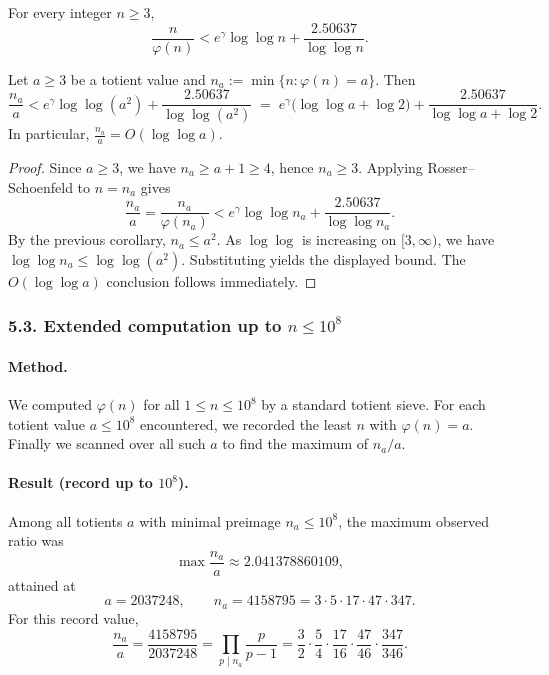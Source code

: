\begin{theorem}
For every integer $n\ge 3$,
\[
\frac{n}{\varphi(n)}<e^{\gamma}\log\log n+\frac{2.50637}{\log\log n}.
\]
\end{theorem}

\begin{theorem}
Let $a\ge 3$ be a totient value and $n_a:=\min\{n:\varphi(n)=a\}$.
Then
\[
\frac{n_a}{a}<e^{\gamma}\log\log(a^2)+\frac{2.50637}{\log\log(a^2)}
\;=\;
 e^{\gamma}\bigl(\log\log a+\log 2\bigr)+\frac{2.50637}{\log\log a+\log 2}.
\]
In particular, $\frac{n_a}{a}=O(\log\log a)$.
\end{theorem}

\begin{proof}
Since $a\ge 3$, we have $n_a\ge a+1\ge 4$, hence $n_a\ge 3$.
Applying Rosser--Schoenfeld to $n=n_a$ gives
\[
\frac{n_a}{a}=\frac{n_a}{\varphi(n_a)}<e^{\gamma}\log\log n_a+\frac{2.50637}{\log\log n_a}.
\]
By the previous corollary, $n_a\le a^2$.
As $\log\log$ is increasing on $[3,\infty)$, we have $\log\log n_a\le \log\log(a^2)$.
Substituting yields the displayed bound.
The $O(\log\log a)$ conclusion follows immediately.
\end{proof}

\subsubsection*{5.3. Extended computation up to $n\le 10^8$}
\paragraph{Method.}
We computed $\varphi(n)$ for all $1\le n\le 10^8$ by a standard totient sieve.
For each totient value $a\le 10^8$ encountered, we recorded the least $n$ with $\varphi(n)=a$.
Finally we scanned over all such $a$ to find the maximum of $n_a/a$.

\paragraph{Result (record up to $10^8$).}
Among all totients $a$ with minimal preimage $n_a\le 10^8$, the maximum observed ratio was
\[
\max \frac{n_a}{a} \approx 2.041378860109,
\]
attained at
\[
 a=2037248,\qquad n_a=4158795=3\cdot 5\cdot 17\cdot 47\cdot 347.
\]
For this record value,
\[
\frac{n_a}{a}=\frac{4158795}{2037248}=\prod_{p\mid n_a}\frac{p}{p-1}
 =\frac32\cdot\frac54\cdot\frac{17}{16}\cdot\frac{47}{46}\cdot\frac{347}{346}.
\]


